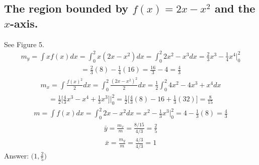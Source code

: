 \documentclass{article}
\begin{document}
\subsection{The region bounded by $f(x) = 2x - x^2$ and the $x$-axis.}
See Figure 5.
\begin{align*}
	m_y = \int {x f(x)}dx = \int_0^2 {x(2x - x^2)}dx = \int_0^2 {2x^2 - x^3}dx = \frac{2}{3}x^3 - \frac{1}{4}x^4 \bigg|_0^2
\end{align*}
\begin{align*}
	= \frac{2}{3}(8) - \frac{1}{4}(16) = \frac{16}{3} - 4 = \frac{4}{3}
\end{align*}
\begin{align*}
	m_x = \int \frac{f(x)^2}{2}dx = \int_0^2 {\frac{(2x - x^2)^2}{2}}dx = \frac{1}{2} \int_0^2 {4x^2 - 4x^3 + x^4}dx
\end{align*}
\begin{align*}
	= \frac{1}{2} \bigg[ \frac{4}{3}x^3 - x^4 + \frac{1}{3}x^3 \bigg] \bigg|_0^2 = \frac{1}{2} \bigg[ \frac{4}{3}(8) - 16 + \frac{1}{3}(32) \bigg] = \frac{8}{15}
\end{align*}
\begin{align*}
	m = \int {f(x)}dx = \int_0^2 {2x - x^2}dx = x^2 - \frac{1}{3}x^3 \bigg|_0^2 = 4 - \frac{1}{3}(8) = \frac{4}{3}
\end{align*}
\begin{align*}
	\bar{y} = \frac{m_x}{m} = \frac{8/15}{4/3} = \frac{2}{5}
\end{align*}
\begin{align*}
	\bar{x} = \frac{m_y}{m} = \frac{4/3}{4/3} = 1
\end{align*}
Answer: $\bigg( 1, \frac{2}{5} \bigg)$

\end{document}
